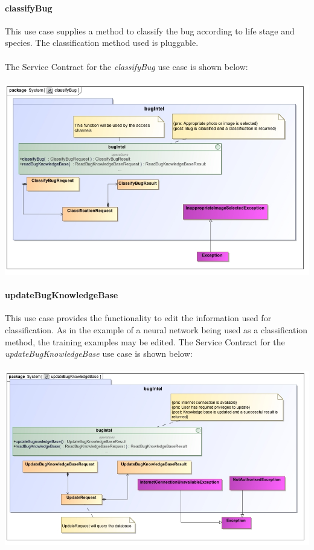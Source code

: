 \documentclass[11pt,a4paper,titlepage]{article}
\begin{document}
		\paragraph{classifyBug }
		This use case supplies a method to classify the bug according to life stage and species. The classification method used is pluggable.\\\hfill\\
		The Service Contract for the \textit{classifyBug} use case is shown below:\\\hfill\\
		\includegraphics[width=\linewidth]{classifyBug}
		
		\paragraph{updateBugKnowledgeBase }		
		This use case provides the functionality to edit the information used for classification. As in the example of a neural network being used as a classification method, the training examples may be edited.		
		The Service Contract for the \textit{updateBugKnowledgeBase} use case is shown below:\\\hfill\\
		\includegraphics[width=\linewidth]{updateBugKnowledgeBase}
		
\end{document}
